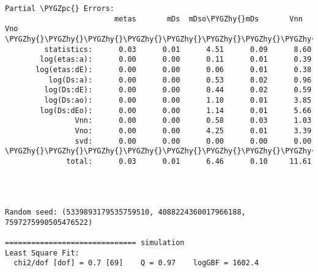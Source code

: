 \documentclass[letterpaper,10pt,english]{sphinxmanual}
\def\PYGZpc{\char`\%}
\def\PYGZhy{\char`\-}
\begin{document}
\begin{Verbatim}[commandchars=\\\{\}]
Partial \PYGZpc{} Errors:
                         metas       mDs  mDso\PYGZhy{}mDs       Vnn       Vno
\PYGZhy{}\PYGZhy{}\PYGZhy{}\PYGZhy{}\PYGZhy{}\PYGZhy{}\PYGZhy{}\PYGZhy{}\PYGZhy{}\PYGZhy{}\PYGZhy{}\PYGZhy{}\PYGZhy{}\PYGZhy{}\PYGZhy{}\PYGZhy{}\PYGZhy{}\PYGZhy{}\PYGZhy{}\PYGZhy{}\PYGZhy{}\PYGZhy{}\PYGZhy{}\PYGZhy{}\PYGZhy{}\PYGZhy{}\PYGZhy{}\PYGZhy{}\PYGZhy{}\PYGZhy{}\PYGZhy{}\PYGZhy{}\PYGZhy{}\PYGZhy{}\PYGZhy{}\PYGZhy{}\PYGZhy{}\PYGZhy{}\PYGZhy{}\PYGZhy{}\PYGZhy{}\PYGZhy{}\PYGZhy{}\PYGZhy{}\PYGZhy{}\PYGZhy{}\PYGZhy{}\PYGZhy{}\PYGZhy{}\PYGZhy{}\PYGZhy{}\PYGZhy{}\PYGZhy{}\PYGZhy{}\PYGZhy{}\PYGZhy{}\PYGZhy{}\PYGZhy{}\PYGZhy{}\PYGZhy{}\PYGZhy{}\PYGZhy{}\PYGZhy{}\PYGZhy{}\PYGZhy{}\PYGZhy{}\PYGZhy{}\PYGZhy{}\PYGZhy{}\PYGZhy{}
         statistics:      0.03      0.01      4.51      0.09      8.60
        log(etas:a):      0.00      0.00      0.11      0.01      0.39
       log(etas:dE):      0.00      0.00      0.06      0.01      0.38
          log(Ds:a):      0.00      0.00      0.53      0.02      0.96
         log(Ds:dE):      0.00      0.00      0.44      0.02      0.59
         log(Ds:ao):      0.00      0.00      1.10      0.01      3.85
        log(Ds:dEo):      0.00      0.00      1.14      0.01      5.66
                Vnn:      0.00      0.00      0.58      0.03      1.03
                Vno:      0.00      0.00      4.25      0.01      3.39
                svd:      0.00      0.00      0.00      0.00      0.00
\PYGZhy{}\PYGZhy{}\PYGZhy{}\PYGZhy{}\PYGZhy{}\PYGZhy{}\PYGZhy{}\PYGZhy{}\PYGZhy{}\PYGZhy{}\PYGZhy{}\PYGZhy{}\PYGZhy{}\PYGZhy{}\PYGZhy{}\PYGZhy{}\PYGZhy{}\PYGZhy{}\PYGZhy{}\PYGZhy{}\PYGZhy{}\PYGZhy{}\PYGZhy{}\PYGZhy{}\PYGZhy{}\PYGZhy{}\PYGZhy{}\PYGZhy{}\PYGZhy{}\PYGZhy{}\PYGZhy{}\PYGZhy{}\PYGZhy{}\PYGZhy{}\PYGZhy{}\PYGZhy{}\PYGZhy{}\PYGZhy{}\PYGZhy{}\PYGZhy{}\PYGZhy{}\PYGZhy{}\PYGZhy{}\PYGZhy{}\PYGZhy{}\PYGZhy{}\PYGZhy{}\PYGZhy{}\PYGZhy{}\PYGZhy{}\PYGZhy{}\PYGZhy{}\PYGZhy{}\PYGZhy{}\PYGZhy{}\PYGZhy{}\PYGZhy{}\PYGZhy{}\PYGZhy{}\PYGZhy{}\PYGZhy{}\PYGZhy{}\PYGZhy{}\PYGZhy{}\PYGZhy{}\PYGZhy{}\PYGZhy{}\PYGZhy{}\PYGZhy{}\PYGZhy{}
              total:      0.03      0.01      6.46      0.10     11.61




Random seed: (5339893179535759510, 4088224360017966188, 7597275990505476522)

============================== simulation
Least Square Fit:
  chi2/dof [dof] = 0.7 [69]    Q = 0.97    logGBF = 1602.4


\end{Verbatim}
\end{document}
